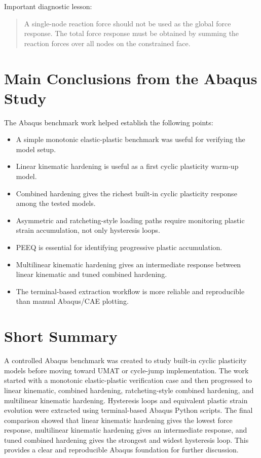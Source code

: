\documentclass[11pt,a4paper]{article}
\begin{document}
Important diagnostic lesson:
\begin{quote}
A single-node reaction force should not be used as the global force response. The total force response must be obtained by summing the reaction forces over all nodes on the constrained face.
\end{quote}

\section{Main Conclusions from the Abaqus Study}

The Abaqus benchmark work helped establish the following points:

\begin{itemize}
    \item A simple monotonic elastic-plastic benchmark was useful for verifying the model setup.
    \item Linear kinematic hardening is useful as a first cyclic plasticity warm-up model.
    \item Combined hardening gives the richest built-in cyclic plasticity response among the tested models.
    \item Asymmetric and ratcheting-style loading paths require monitoring plastic strain accumulation, not only hysteresis loops.
    \item PEEQ is essential for identifying progressive plastic accumulation.
    \item Multilinear kinematic hardening gives an intermediate response between linear kinematic and tuned combined hardening.
    \item The terminal-based extraction workflow is more reliable and reproducible than manual Abaqus/CAE plotting.
\end{itemize}



\section*{Short Summary }

A controlled Abaqus benchmark was created to study built-in cyclic plasticity models before moving toward UMAT or cycle-jump implementation. The work started with a monotonic elastic-plastic verification case and then progressed to linear kinematic, combined hardening, ratcheting-style combined hardening, and multilinear kinematic hardening. Hysteresis loops and equivalent plastic strain evolution were extracted using terminal-based Abaqus Python scripts. The final comparison showed that linear kinematic hardening gives the lowest force response, multilinear kinematic hardening gives an intermediate response, and tuned combined hardening gives the strongest and widest hysteresis loop. This provides a clear and reproducible Abaqus foundation for further discussion.
\end{document}
